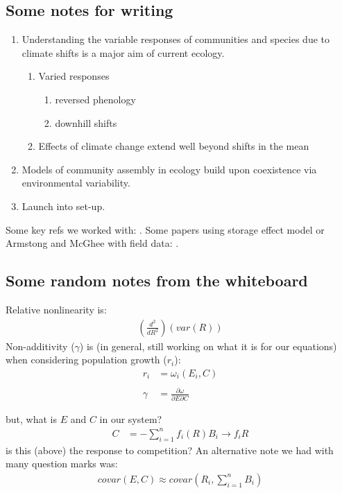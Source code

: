 \documentclass[11pt,a4paper,oneside]{article}
\begin{document}
\subsection{Some notes for writing}
\begin{enumerate}
\item Understanding the variable responses of communities and species
  due to climate shifts is a major aim of current
ecology.
\begin{enumerate}
\item Varied responses
\begin{enumerate}
\item reversed phenology \citep{yu2010} 
\item downhill shifts \citep{Crimmins:2011dq}
\end{enumerate}
\item Effects of climate change extend well beyond shifts in the mean
\end{enumerate}
\item Models of community assembly in ecology build upon coexistence
  via environmental variability.
\item Launch into set-up.
\end{enumerate}
\noindent Some key refs we worked with:
\citep{Chesson:1993gi,Chesson:2000ak,Chesson:2000vd,Chesson:2004eo}. Some
papers using storage effect model or Armstong and McGhee with field
data: \citep{Angert:2009,Kuang:2008ri,Kuang:2009rj,Levine:2009ym}.\\

\subsection{Some random notes from the whiteboard}
\noindent Relative nonlinearity is:
\begin{align*}
\left(\frac{d^{2}}{dR^{2}}\right)(var(R))
\end{align*}
\noindent Non-additivity (\(\gamma\)) is (in general, still working on
what it is for our equations) when considering population growth
(\(r_{i}\)):
\begin{align*}
r_{i} & = \omega_{i}(E_{i}, C)
\\
\\
\gamma & = \frac{\partial \omega}{\partial E \partial C} 
\end{align*}

\noindent but, what is \(E\) and \(C\) in our system?
\begin{align*}
C & = - \sum_{i=1}^{n}f_{i}(R)B_{i} \rightarrow f_{i}R
\end{align*}
\noindent is this (above) the response to
  competition? An alternative note we had with many question marks
  was:
\begin{align*}
covar(E,C) \approx covar\left(R_{i}, \sum_{i=1}^{n}B_{i}\right)
\end{align*}
\end{document}
